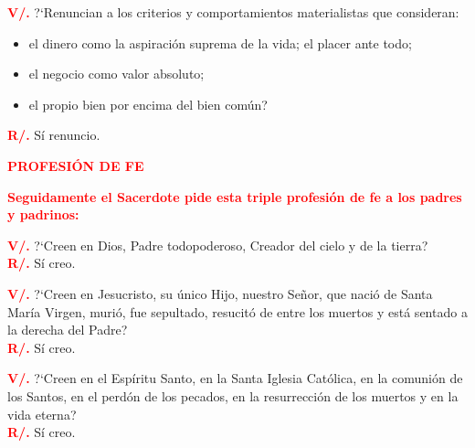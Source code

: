 \documentclass[12pt, letterpaper]{report}
\begin{document}
\noindent
\Large {\bfseries \textcolor{red}{V/.}} \hspace{0.5cm} ?`Renuncian a los criterios y comportamientos materialistas que consideran:
\begin{itemize}[leftmargin=2.0cm,labelsep=0.5cm]
\item el dinero como la aspiraci\'on suprema de la vida; el placer ante todo;
\item el negocio como valor absoluto;
\item el propio bien por encima del bien com\'un?
\end{itemize}
\Large {\bfseries \textcolor{red}{R/.}} \hspace{0.5cm} S\'i renuncio. \newline

\Large {\bfseries \textcolor{red}{PROFESI\'ON DE FE}} \newline

\large {\bfseries \textcolor{red}{Seguidamente el Sacerdote pide esta triple profesi\'on de fe a los padres y padrinos:}} \newline

\noindent
\Large {\bfseries \textcolor{red}{V/.}} \hspace{0.5cm} ?`Creen en Dios, Padre todopoderoso, Creador del cielo y de la tierra? \\
\Large {\bfseries \textcolor{red}{R/.}} \hspace{0.5cm} S\'i creo. \newline

\noindent
\Large {\bfseries \textcolor{red}{V/.}} \hspace{0.5cm} ?`Creen en Jesucristo, su \'unico Hijo, nuestro Se\~nor, que naci\'o de Santa Mar\'ia Virgen, muri\'o, fue sepultado, resucit\'o de entre los muertos y est\'a sentado a la derecha del Padre? \\
\Large {\bfseries \textcolor{red}{R/.}} \hspace{0.5cm} S\'i creo. \newline

\noindent
\Large {\bfseries \textcolor{red}{V/.}} \hspace{0.5cm} ?`Creen en el Esp\'iritu Santo, en la Santa Iglesia Cat\'olica, en la comuni\'on de los Santos, en el perd\'on de los pecados, en la resurrecci\'on de los muertos y en la vida eterna? \\
\Large {\bfseries \textcolor{red}{R/.}} \hspace{0.5cm} S\'i creo. \newline
\end{document}
